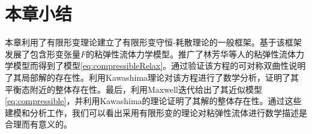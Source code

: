 \documentclass{article}
\begin{document}


\section{本章小结}
本章利用了有限形变理论建立了有限形变守恒-耗散理论的一般框架。基于该框架发展了包含形变张量$F$的粘弹性流体力学模型。推广了林芳华等人的粘弹性流体力学模型而得到了模型\eqref{eq:compressibleRelax}。通过验证该方程的可对称双曲性说明了其局部解的存在性。利用Kawashima理论对该方程进行了数学分析，证明了其平衡态附近的整体存在性。最后，利用Maxwell迭代给出了其近似模型\eqref{eq:compressible}，并利用Kawashima的理论证明了其解的整体存在性。通过这些建模和分析工作，我们可以看出采用有限形变的理论对粘弹性流体进行数学描述是合理而有意义的。




\end{document}
